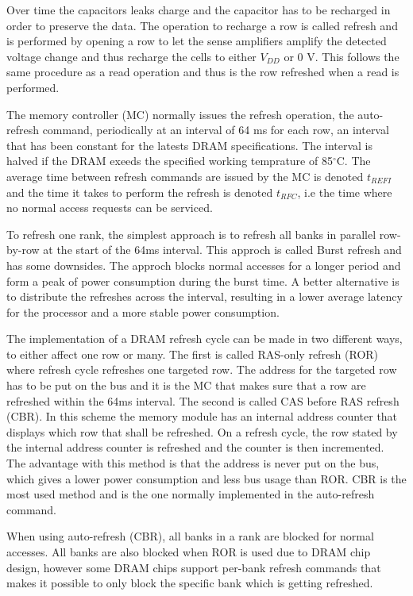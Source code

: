 Over time the capacitors leaks charge and the capacitor has to be recharged in order to preserve the data. The operation to recharge a row is called refresh and is performed by opening a row to let the sense amplifiers amplify the detected voltage change and thus recharge the cells to either \(V_{DD}\) or 0 V. This follows the same procedure as a read operation and thus is the row refreshed when a read is performed. 

The memory controller (MC) normally issues the refresh operation, the auto-refresh command, periodically at an interval of 64 ms for each row, an interval that has been constant for the latests DRAM specifications. The interval is halved if the DRAM exeeds the specified working temprature of 85$^{\circ}$C. The average time between refresh commands are issued by the MC is denoted \(t_{REFI}\) and the time it takes to perform the refresh is denoted \(t_{RFC}\), i.e the time where no normal access requests can be serviced.

To refresh one rank, the simplest approach is to refresh all banks in parallel row-by-row at the start of the 64ms interval. This approch is called Burst refresh and has some downsides. The approch blocks normal accesses for a longer period and form a peak of power consumption during the burst time. A better alternative is to distribute the refreshes across the interval, resulting in a lower average latency for the processor and a more stable power consumption.

The implementation of a DRAM refresh cycle can be made in two different ways, to either affect one row or many. The first is called RAS-only refresh (ROR) where refresh cycle refreshes one targeted row. The address for the targeted row has to be put on the bus and it is the MC that makes sure that a row are refreshed within the 64ms interval. The second is called CAS before RAS refresh (CBR). In this scheme the memory module has an internal address counter that displays which row that shall be refreshed. On a refresh cycle, the row stated by the internal address counter is refreshed and the counter is then incremented. The advantage with this method is that the address is never put on the bus, which gives a lower power consumption and less bus usage than ROR. CBR is the most used method and is the one normally implemented in the auto-refresh command. 

When using auto-refresh (CBR), all banks in a rank are blocked for normal accesses. All banks are also blocked when ROR is used due to DRAM chip design, however some DRAM chips support per-bank refresh commands that makes it possible to only block the specific bank which is getting refreshed. 

